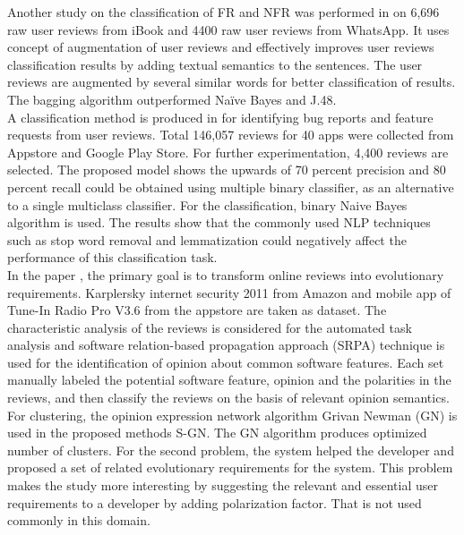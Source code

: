 	Another study on the classification of FR
and NFR was performed in \cite{lu2017automatic} on 6,696 raw user reviews from
iBook and 4400 raw user reviews from WhatsApp. It uses concept of
augmentation of user reviews and effectively improves user reviews classification results by
adding textual semantics to the sentences. The user reviews are augmented by several similar
words for better classification of results. The bagging algorithm outperformed Naïve Bayes and J.48.\\

	A classification method is produced in \cite{maalej2015bug} for identifying
bug reports and feature requests from user reviews. Total 146,057 reviews for 40 apps were
collected from Appstore and Google Play Store. For further experimentation, 4,400 reviews
are selected. The proposed model shows the upwards of 70 percent precision and 80 percent
recall could be obtained using multiple binary classifier, as an alternative to a single multiclass
classifier. For the classification, binary Naive Bayes algorithm is used. The results show that
the commonly used NLP techniques such as stop word removal and lemmatization could
negatively affect the performance of this classification task.\\

	In the paper \cite{jiang2014}, the primary goal is to transform online reviews into evolutionary requirements.
Karplersky internet security 2011 from Amazon and mobile app of Tune-In Radio Pro V3.6
from the appstore are taken as dataset. The characteristic analysis of the reviews is
considered for the automated task analysis and software relation-based propagation approach
(SRPA) technique is used for the identification of opinion about common software features. Each set
manually labeled the potential software feature, opinion and the polarities in the reviews, and
then classify the reviews on the basis of relevant opinion semantics. For clustering, the opinion
expression network algorithm Grivan Newman (GN) is used in the proposed methods S-GN. The GN algorithm produces optimized number of clusters. For the second problem, the system helped the developer and proposed a set of related evolutionary requirements for the system. This problem makes the study more interesting by suggesting the relevant and essential user requirements to a developer by adding polarization factor. That is not used
commonly in this domain.\\

